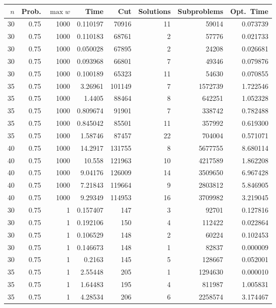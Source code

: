 \documentclass[a4paper,11pt]{article}
\begin{document}
\begin{table}
\begin{center}
\begin{tabular}{|rrr|r|r|rr|r|}
\hline
$n$ & Prob. & $\max w$ & Time & Cut & Solutions & Subproblems & Opt.\ Time \\
\hline
30 & 0.75 & 1000 & 0.110197 & 70916 & 11 & 59014 & 0.073739 \\
30 & 0.75 & 1000 & 0.110183 & 68761 & 2 & 57776 & 0.021733 \\
30 & 0.75 & 1000 & 0.050028 & 67895 & 2 & 24208 & 0.026681 \\
30 & 0.75 & 1000 & 0.093968 & 66801 & 7 & 49346 & 0.079876 \\
30 & 0.75 & 1000 & 0.100189 & 65323 & 11 & 54630 & 0.070855 \\
35 & 0.75 & 1000 & 3.26961 & 101149 & 7 & 1572739 & 1.722546 \\
35 & 0.75 & 1000 & 1.4405 & 88464 & 8 & 642251 & 1.052328 \\
35 & 0.75 & 1000 & 0.809674 & 91901 & 7 & 338742 & 0.782488 \\
35 & 0.75 & 1000 & 0.845042 & 85501 & 11 & 357992 & 0.619300 \\
35 & 0.75 & 1000 & 1.58746 & 87457 & 22 & 704004 & 0.571071 \\
40 & 0.75 & 1000 & 14.2917 & 131755 & 8 & 5677755 & 8.680114 \\
40 & 0.75 & 1000 & 10.558 & 121963 & 10 & 4217589 & 1.862208 \\
40 & 0.75 & 1000 & 9.04176 & 126009 & 14 & 3509650 & 6.967428 \\
40 & 0.75 & 1000 & 7.21843 & 119664 & 9 & 2803812 & 5.846905 \\
40 & 0.75 & 1000 & 9.29349 & 114953 & 16 & 3709982 & 3.219045 \\
\hline
30 & 0.75 & 1 & 0.157407 & 147 & 3 & 92701 & 0.127816 \\
30 & 0.75 & 1 & 0.192106 & 150 & 4 & 112422 & 0.022864 \\
30 & 0.75 & 1 & 0.106529 & 148 & 2 & 60224 & 0.102453 \\
30 & 0.75 & 1 & 0.146673 & 148 & 1 & 82837 & 0.000009 \\
30 & 0.75 & 1 & 0.2163 & 145 & 5 & 128667 & 0.052001 \\
35 & 0.75 & 1 & 2.55448 & 205 & 1 & 1294630 & 0.000010 \\
35 & 0.75 & 1 & 1.64483 & 195 & 4 & 811987 & 1.005831 \\
35 & 0.75 & 1 & 4.28534 & 206 & 6 & 2258574 & 3.174467 \\

\end{tabular}
\end{center}
\end{table}
\end{document}
